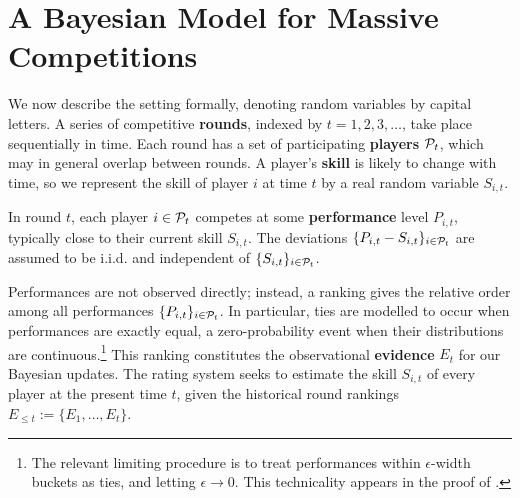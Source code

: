 
\section{A Bayesian Model for Massive Competitions}
\label{sec:bayes_model}

We now describe the setting formally, denoting random variables by capital letters. A series of competitive \textbf{rounds}, indexed by $t=1,2,3,\ldots$, take place sequentially in time. Each round has a set of participating \textbf{players} $\mathcal{P}_t$, which may in general overlap between rounds. A player's \textbf{skill} is likely to change with time, so we represent the skill of player $i$ at time $t$ by a real random variable $S_{i,t}$.

In round $t$, each player $i\in \mathcal{P}_t$ competes at some \textbf{performance} level $P_{i,t}$, typically close to their current skill $S_{i,t}$. The deviations $\{P_{i,t}-S_{i,t}\}_{i\in\mathcal{P}_t}$ are assumed to be i.i.d. and independent of $\{S_{i,t}\}_{i\in\mathcal{P}_t}$.

Performances are not observed directly; instead, a ranking gives the relative order among all performances $\{P_{i,t}\}_{i\in\mathcal{P}_t}$. In particular, ties are modelled to occur when performances are exactly equal, a zero-probability event when their distributions are continuous.\footnote{
The relevant limiting procedure is to treat performances within $\epsilon$-width buckets as ties, and letting $\epsilon\rightarrow 0$. This technicality appears in the proof of .} This ranking constitutes the observational \textbf{evidence} $E_t$ for our Bayesian updates. The rating system seeks to estimate the skill $S_{i,t}$ of every player at the present time $t$, given the historical round rankings $E_{\le t} := \{ E_1,\ldots,E_t \}$.

